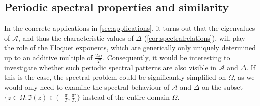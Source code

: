 \documentclass[english]{myarticle}
\begin{document}
\begin{sloppypar}
\subsection{Periodic spectral properties and similarity} \label{subsec:periodicspectral}
In the concrete applications in \cref{sec:applications}, it turns out that the eigenvalues of $\mathcal{A}$, and thus the characteristic values of $\Delta$ (\cref{cor:spectralrelations}), will play the role of the Floquet exponents, which are generically only uniquely determined up to an additive multiple of $\frac{2 \pi i}{T}$. Consequently, it would be interesting to investigate whether such periodic spectral patterns are also visible in $\mathcal{A}$ and $\Delta$. If this is the case, the spectral problem could be significantly simplified on $\Omega$, as we would only need to examine the spectral behaviour of $\mathcal{A}$ and $\Delta$ on the subset $\{z \in \Omega : \Im(z) \in (-\frac{\pi}{T}, \frac{\pi}{T}] \}$ instead of the entire domain $\Omega$.


\end{sloppypar}
\end{document}
